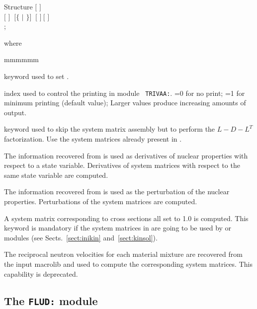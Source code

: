 \begin{DataStructure}{Structure }
$[$   $]$ \\
$[$  $]$ $~[\{$  $|$  $\}]$ $~[$  $]~[$  $]$\\
;
\end{DataStructure}

\noindent where
\begin{ListeDeDescription}{mmmmmm}

\item[\moc{EDIT}] keyword used to set .

\item[\dusa{iprint}] index used to control the printing  in module {\tt
TRIVAA:}. =0 for no print; =1 for minimum printing (default value); Larger
values produce increasing amounts of output.

\item[\moc{SKIP}] keyword used to skip the system matrix assembly but to perform the $L-D-L^T$ factorization. Use the system matrices already present in .

\item[\moc{DERI}] The information recovered from   is used as
derivatives of nuclear properties with respect to a state variable.
Derivatives of system matrices with respect to the same state variable are
computed.

\item[\moc{PERT}] The information recovered from   is used as
the perturbation of the nuclear properties. Perturbations of the system matrices
are computed.

\item[\moc{UNIT}] A system matrix corresponding to cross sections all set to 1.0 is computed. This keyword is mandatory if
the system matrices in  are going to be used by  or  modules (see Sects.~\ref{sect:inikin}
and~\ref{sect:kinsol}).

\item[\moc{OVEL}] The reciprocal neutron velocities for each material mixture are recovered from the input {\sc macrolib}  and used
to compute the corresponding system matrices. This capability is deprecated.

\end{ListeDeDescription}
\clearpage

\subsection{The {\tt FLUD:} module}

